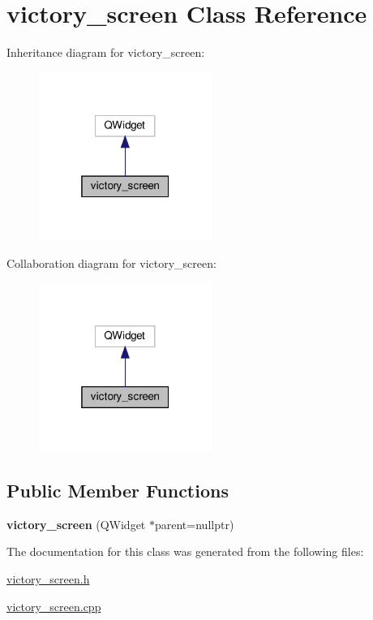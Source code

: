 \hypertarget{classvictory__screen}{}\section{victory\+\_\+screen Class Reference}
\label{classvictory__screen}


Inheritance diagram for victory\+\_\+screen\+:\nopagebreak
\begin{figure}[H]
\begin{center}
\leavevmode
\includegraphics[width=160pt]{classvictory__screen__inherit__graph}
\end{center}
\end{figure}


Collaboration diagram for victory\+\_\+screen\+:\nopagebreak
\begin{figure}[H]
\begin{center}
\leavevmode
\includegraphics[width=160pt]{classvictory__screen__coll__graph}
\end{center}
\end{figure}
\subsection*{Public Member Functions}
\begin{DoxyCompactItemize}
\item 
\mbox{\label{classvictory__screen_a5e81e9d86f259ff268b5bc3a3939817b}} 
{\bfseries victory\+\_\+screen} (Q\+Widget $\ast$parent=nullptr)
\end{DoxyCompactItemize}


The documentation for this class was generated from the following files\+:\begin{DoxyCompactItemize}
\item 
\hyperlink{victory__screen_8h}{victory\+\_\+screen.\+h}\item 
\hyperlink{victory__screen_8cpp}{victory\+\_\+screen.\+cpp}\end{DoxyCompactItemize}
